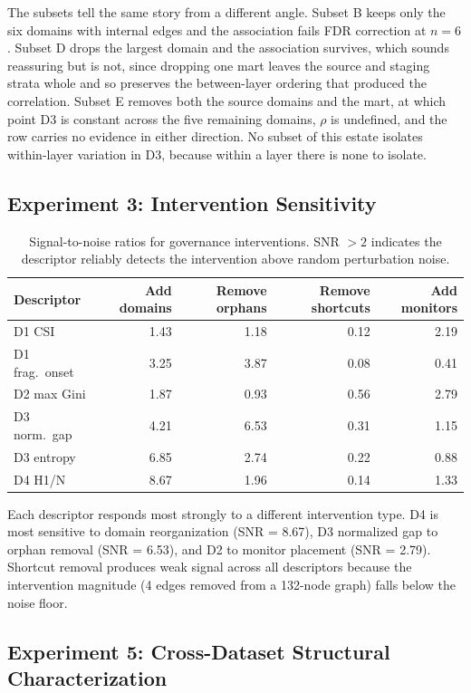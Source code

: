 \documentclass[11pt,a4paper]{article}
\begin{document}
The subsets tell the same story from a different angle. Subset B keeps
only the six domains with internal edges and the association fails FDR
correction at $n = 6$. Subset D drops the largest domain and the
association survives, which sounds reassuring but is not, since dropping
one mart leaves the source and staging strata whole and so preserves the
between-layer ordering that produced the correlation. Subset E removes
both the source domains and the mart, at which point D3 is constant
across the five remaining domains, $\rho$ is undefined, and the row
carries no evidence in either direction. No subset of this estate
isolates within-layer variation in D3, because within a layer there is
none to isolate.

\subsection{Experiment 3: Intervention Sensitivity}

\begin{table}[htb]
\centering
\caption{Signal-to-noise ratios for governance interventions.
  SNR $> 2$ indicates the descriptor reliably detects the intervention
  above random perturbation noise.}
\label{tab:exp3}
\begin{tabular}{lrrrr}
\toprule
Descriptor & Add domains & Remove orphans & Remove shortcuts & Add monitors \\
\midrule
D1 CSI & 1.43 & 1.18 & 0.12 & 2.19 \\
D1 frag.\ onset & 3.25 & 3.87 & 0.08 & 0.41 \\
D2 max Gini & 1.87 & 0.93 & 0.56 & 2.79 \\
D3 norm.\ gap & 4.21 & 6.53 & 0.31 & 1.15 \\
D3 entropy & 6.85 & 2.74 & 0.22 & 0.88 \\
D4 H1/N & 8.67 & 1.96 & 0.14 & 1.33 \\
\bottomrule
\end{tabular}
\end{table}

Each descriptor responds most strongly to a different intervention
type. D4 is most sensitive to domain reorganization (SNR = 8.67),
D3 normalized gap to orphan removal (SNR = 6.53), and D2 to monitor
placement (SNR = 2.79). Shortcut removal produces weak signal across
all descriptors because the intervention magnitude (4 edges removed
from a 132-node graph) falls below the noise floor.

\subsection{Experiment 5: Cross-Dataset Structural Characterization}
\end{document}
